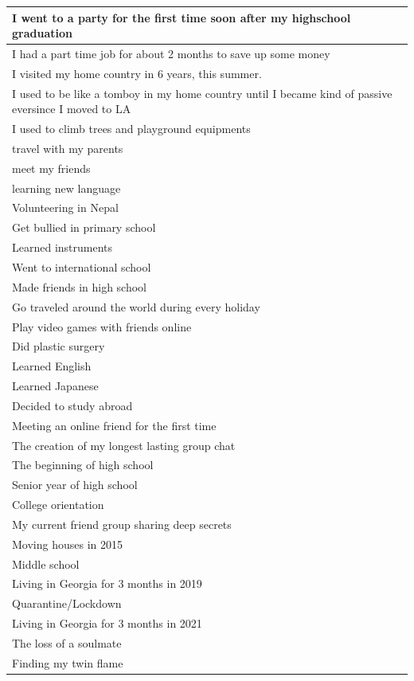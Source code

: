 \documentclass[
  .7em,
  letterpaper,
  DIV=11,
  numbers=noendperiod]{scrartcl}
\begin{document}
\begin{table}
\begin{tabular}{l}
\hline
I went to a party for the first time soon after my highschool graduation\\
\hline
I had a part time job for about 2 months to save up some money\\
\hline
I visited my home country in 6 years, this summer.\\
\hline
I used to be like a tomboy in my home country until I became kind of passive eversince I moved to LA\\
\hline
I used to climb trees and playground equipments\\
\hline
travel with my parents\\
\hline
meet my friends\\
\hline
learning new language\\
\hline
Volunteering in Nepal\\
\hline
Get bullied in primary school\\
\hline
Learned instruments\\
\hline
Went to international school\\
\hline
Made friends in high school\\
\hline
Go traveled around the world during every holiday\\
\hline
Play video games with friends online\\
\hline
Did plastic surgery\\
\hline
Learned English\\
\hline
Learned Japanese\\
\hline
Decided to study abroad\\
\hline
Meeting an online friend for the first time\\
\hline
The creation of my longest lasting group chat\\
\hline
The beginning of high school\\
\hline
Senior year of high school\\
\hline
College orientation\\
\hline
My current friend group sharing deep secrets\\
\hline
Moving houses in 2015\\
\hline
Middle school\\
\hline
Living in Georgia for 3 months in 2019\\
\hline
Quarantine/Lockdown\\
\hline
Living in Georgia for 3 months in 2021\\
\hline
The loss of a soulmate\\
\hline
Finding my twin flame\\

\end{tabular}
\end{table}
\end{document}
